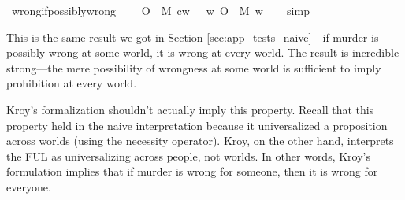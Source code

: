 \begin{isabellebody}
{}\isanewline
\isanewline
{}\isamarkupfalse%
\ wrong{\isacharunderscore}if{\isacharunderscore}possibly{\isacharunderscore}wrong{\isacharcolon}\isanewline
\ \ \ {\isachardoublequoteopen}{\isacharparenleft}{\isacharparenleft}{\isasymdiamond}\ {\isacharparenleft}O\ {\isacharbraceleft}\isactrlbold {\isasymnot}\ M{\isacharbraceright}{\isacharparenright}{\isacharparenright}\ cw{\isacharparenright}\ {\isasymlongrightarrow}\ \ {\isacharparenleft}{\isasymforall}w{\isachardot}\ {\isacharparenleft}O\ {\isacharbraceleft}\isactrlbold {\isasymnot}\ M{\isacharbraceright}{\isacharparenright}\ w{\isacharparenright}{\isachardoublequoteclose}\isanewline
%
\isadelimproof
\ \ %
\endisadelimproof
%
\isatagproof
{}\isamarkupfalse%
\ simp\isanewline
%
%
\endisatagproof
{\isafoldproof}%
%
\isadelimproof
%
\endisadelimproof
%
\begin{isamarkuptext}%
This is the same result we got in Section \ref{sec:app_tests_naive}—if murder is possibly wrong at some world, it is wrong at
every world. The result is incredible strong—the mere possibility of wrongness at some world is sufficient
to imply prohibition at $\text{every world}$. 

Kroy's formalization shouldn't actually imply this property. Recall that this property held in the 
naive interpretation because it universalized a proposition across worlds (using the necessity operator).
Kroy, on the other hand, interprets the FUL as universalizing across $\text{people}$, not worlds. 
In other words, Kroy's formulation implies that if murder is wrong for someone, then it is wrong for 
everyone. 


\end{isamarkuptext}
\end{isabellebody}
